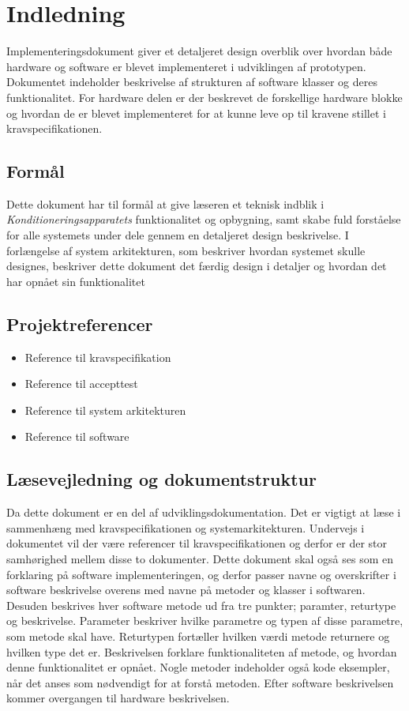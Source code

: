 	\chapter{Indledning}
	Implementeringsdokument giver et detaljeret design overblik over hvordan både hardware og software er blevet implementeret i udviklingen af prototypen. Dokumentet indeholder beskrivelse af strukturen af software klasser og deres funktionalitet. For hardware delen er der beskrevet de forskellige hardware blokke og hvordan de er blevet implementeret for at kunne leve op til kravene stillet i kravspecifikationen. 
	
	\section{Formål}
	Dette dokument har til formål at give læseren et teknisk indblik i \textit{Konditioneringsapparatets} funktionalitet og opbygning, samt skabe fuld forståelse for alle systemets under dele gennem en detaljeret design beskrivelse. I forlængelse af system arkitekturen, som beskriver hvordan systemet skulle designes, beskriver dette dokument det færdig design i detaljer og hvordan det har opnået sin funktionalitet
	
	\section{Projektreferencer}
	\begin{itemize}
		\item Reference til kravspecifikation
		\item Reference til accepttest
		\item Reference til system arkitekturen
		\item Reference til software
	\end{itemize}
	
	\section{Læsevejledning og dokumentstruktur}
	Da dette dokument er en del af udviklingsdokumentation. Det er vigtigt at læse i sammenhæng med kravspecifikationen og systemarkitekturen. Undervejs i dokumentet vil der være referencer til kravspecifikationen og derfor er der stor samhørighed mellem disse to dokumenter. Dette dokument skal også ses som en forklaring på software implementeringen, og derfor passer navne og overskrifter i software beskrivelse overens med navne på metoder og klasser i softwaren. Desuden beskrives hver software metode ud fra tre punkter; paramter, returtype og beskrivelse. Parameter beskriver hvilke parametre og typen af disse parametre, som metode skal have. Returtypen fortæller hvilken værdi metode returnere og hvilken type det er. Beskrivelsen forklare funktionaliteten af metode, og hvordan denne funktionalitet er opnået. Nogle metoder indeholder også kode eksempler, når det anses som nødvendigt for at forstå metoden. Efter software beskrivelsen kommer overgangen til hardware beskrivelsen.
	
